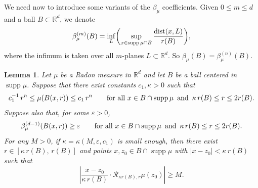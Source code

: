 \documentclass[11pt]{amsart}
\newcommand{\R}{{\mathbb R}}       %
\newcommand{\RR}{{\mathcal R}}
\newcommand{\dist}{{\rm dist}}
\newcommand{\supp}{\operatorname{supp}}
\newcommand{\ve}{{\varepsilon}}
\newcommand{\vv}{{\vspace{2mm}}}
\newtheorem{lemma}[theorem]{Lemma}
\theoremstyle{definition}
\theoremstyle{remark}
\numberwithin{equation}{section}
\begin{document}
\vv

We need now to introduce some variants of the $\beta_\mu$ coefficients.
Given $0\leq m\leq d$ and a ball $B\subset\R^d$, we denote
$$
 \beta_\mu^{(m)}(B) = \inf_L \biggl(\sup_{x\in \supp\mu\cap B}\frac{\dist(x,L)}{r(B)}\biggr),$$
where the infimum is taken over all $m$-planes $L\subset\R^d$.
So $\beta_\mu(B)=\beta_\mu^{(n)}(B)$.

\vv
\begin{lemma}\label{lemaux1}
Let $\mu$ be a Radon measure in $\R^d$ and let $B$ be a ball centered in  $\supp\mu$. Suppose that there
exist constants $c_1,\kappa>0$ such that
\begin{equation}\label{eqad2}
c_1^{-1}\,r^n\leq \mu(B(x,r))\leq c_1\,r^n\qquad \mbox{for all $x\in B\cap \supp\mu$ \,and\, $\kappa \,r(B)\leq r\leq 2r(B)$.}
\end{equation}
Suppose also that, for some $\ve>0$,
$$\beta_\mu^{(d-1)}(B(x,r))\geq \ve \qquad \mbox{for all $x\in B\cap \supp\mu$ \,and\, $\kappa \,r(B)\leq r\leq 2r(B)$.}$$
For any $M>0$, if $\kappa=\kappa(M,\ve,c_1)$ is small enough, then
there exist $r\in[\kappa\, r(B),\, r(B)]$ and
 points $x,z_0\in B\cap\supp\mu$ with $|x-z_0|< \kappa\,r(B)$
such that
\begin{equation}\label{eqfo95}
\left|\frac{x-z_0}{\kappa\,r(B)}\cdot\RR_{\kappa r(B),r}\mu(z_0)\right|\geq M.
\end{equation}
\end{lemma}
\end{document}
